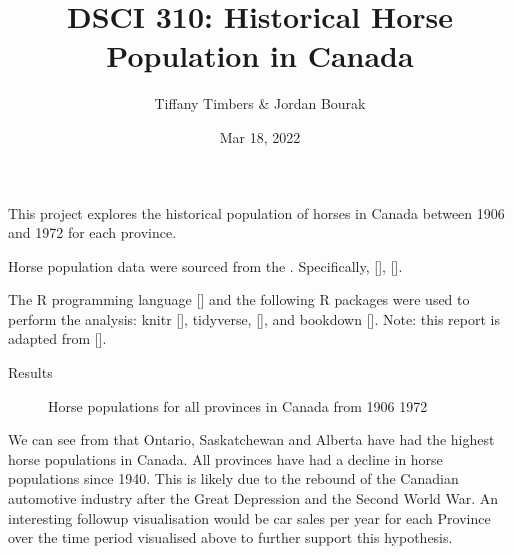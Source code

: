 \documentclass[letterpaper,10pt,english]{jupyterBook}
\title{DSCI 310: Historical Horse Population in Canada}
\date{Mar 18, 2022}
\author{Tiffany Timbers \& Jordan Bourak}
\begin{document}
\pagestyle{empty}
\sphinxmaketitle
\pagestyle{plain}
\sphinxtableofcontents
\pagestyle{normal}
\label{\detokenize{jbook_example::doc}}


\sphinxAtStartPar
This project explores the historical population of horses in Canada
between 1906 and 1972 for each province.

\begin{DUlineblock}{0em}
\item[] 
\end{DUlineblock}

\sphinxAtStartPar
Horse population data were sourced from the .
Specifically, {[}{]}, {[}{]}.

\begin{DUlineblock}{0em}
\item[] 
\end{DUlineblock}

\sphinxAtStartPar
The R programming language {[}{]} and the following R packages were used to perform the analysis: knitr {[}{]}, tidyverse, {[}{]}, and bookdown {[}{]}. Note: this report is adapted from {[}{]}.

\sphinxAtStartPar
Results

\begin{figure}[htbp]
\centering
\capstart

\noindent{}
\caption{Horse populations for all provinces in Canada from 1906 \sphinxhyphen{} 1972}\label{\detokenize{jbook_example:horse-pop-plot}}\end{figure}

\sphinxAtStartPar
We can see from {\hyperref[\detokenize{jbook_example:horse-pop-plot}]{}}
that Ontario, Saskatchewan and Alberta have had the highest horse populations in Canada.
All provinces have had a decline in horse populations since 1940.
This is likely due to the rebound of the Canadian automotive
industry after the Great Depression and the Second World War.
An interesting follow\sphinxhyphen{}up visualisation would be car sales per year for each
Province over the time period visualised above to further support this hypothesis.
\end{document}
